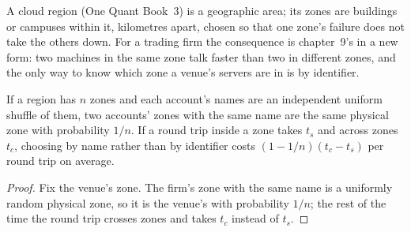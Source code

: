 A cloud region (One Quant Book~3) is a geographic area; its zones are buildings or campuses within it, kilometres apart, chosen so that one
zone's failure does not take the others down. For a trading firm the consequence is chapter~9's in a new form: two machines in the same zone
talk faster than two in different zones, and the only way to know which zone a venue's servers are in is by identifier.

\begin{omfigure}

\label{fig:nw:trading-in-a-public-cloud:names}
\end{omfigure}

\begin{proposition}\label{prop:nw:trading-in-a-public-cloud:names}
If a region has $n$ zones and each account's names are an independent uniform shuffle of them, two accounts' zones with the same name are the
same physical zone with probability $1/n$. If a round trip inside a zone takes $t_s$ and across zones $t_c$, choosing by name rather than by
identifier costs $(1 - 1/n)(t_c - t_s)$ per round trip on average.
\end{proposition}

\begin{proof}
Fix the venue's zone. The firm's zone with the same name is a uniformly random physical zone, so it is the venue's with probability $1/n$; the
rest of the time the round trip crosses zones and takes $t_c$ instead of $t_s$.
\end{proof}

